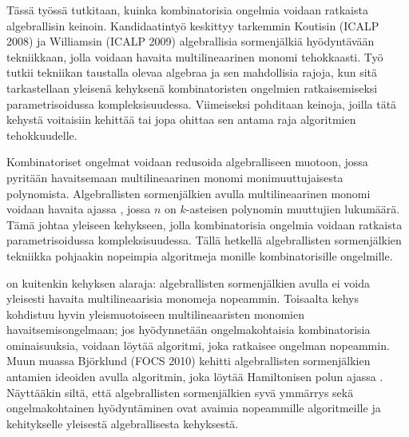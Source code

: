 %
%

\begin{fiabstract}
  Tässä työssä tutkitaan, kuinka kombinatorisia ongelmia voidaan 
  ratkaista %
  algebrallisin keinoin. Kandidaatintyö keskittyy tarkemmin 
  Koutisin (ICALP 2008) ja Williamsin (ICALP 2009) algebrallisia sormenjälkiä hyödyntävään 
  tekniikkaan, jolla voidaan havaita multilineaarinen monomi tehokkaasti. 
  Työ tutkii tekniikan taustalla olevaa algebraa ja sen mahdollisia rajoja,  
  kun sitä tarkastellaan yleisenä kehyksenä kombinatoristen ongelmien ratkaisemiseksi 
  parametrisoidussa kompleksisuudessa. 
  Viimeiseksi pohditaan keinoja, joilla tätä kehystä voitaisiin kehittää tai jopa 
  ohittaa sen antama raja algoritmien tehokkuudelle. 

  Kombinatoriset ongelmat voidaan redusoida algebralliseen muotoon, jossa 
  pyritään havaitsemaan multilineaarinen monomi monimuuttujaisesta polynomista. 
  Algebrallisten sormenjälkien avulla multilineaarinen monomi 
  voidaan havaita ajassa , 
  jossa $n$ on $k$-asteisen polynomin muuttujien lukumäärä. Tämä johtaa yleiseen kehykseen, 
  jolla kombinatorisia ongelmia voidaan ratkaista parametrisoidussa kompleksisuudessa. 
  Tällä hetkellä algebrallisten sormenjälkien 
  tekniikka pohjaakin nopeimpia algoritmeja monille 
  kombinatorisille ongelmille.

   on kuitenkin 
  kehyksen alaraja: algebrallisten sormenjälkien 
  avulla ei voida yleisesti havaita multilineaarisia monomeja nopeammin. Toisaalta 
  kehys kohdistuu hyvin yleismuotoiseen multilineaaristen monomien havaitsemisongelmaan; 
  jos hyödynnetään ongelmakohtaisia kombinatorisia ominaisuuksia, 
  voidaan löytää algoritmi, joka ratkaisee ongelman nopeammin. 
  Muun muassa Björklund (FOCS 2010) kehitti 
  algebrallisten sormenjälkien antamien ideoiden avulla algoritmin, joka 
  löytää Hamiltonisen polun ajassa . 
  Näyttääkin siltä, että algebrallisten sormenjälkien syvä ymmärrys sekä ongelmakohtainen 
  hyödyntäminen ovat avaimia nopeammille algoritmeille ja kehitykselle yleisestä algebrallisesta 
  kehyksestä.
%

\end{fiabstract}

